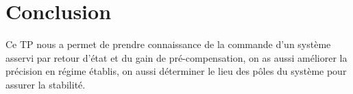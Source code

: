 \chapter*{Conclusion}
Ce TP nous a permet de prendre connaissance de la commande d'un système asservi par  retour d'état et du gain de pré-compensation, on as aussi améliorer la précision en régime établis, on aussi déterminer le lieu des pôles du système pour assurer la stabilité.   
